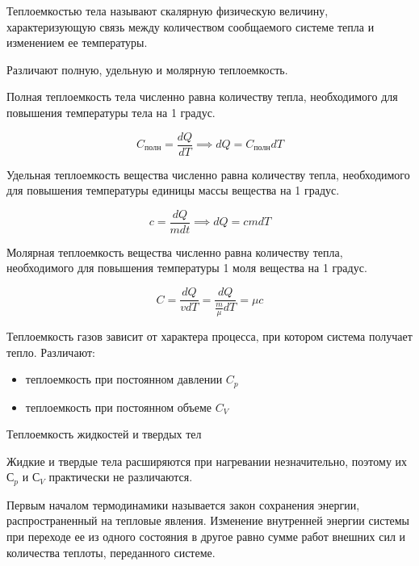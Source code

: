 \begin{definition}
    Теплоемкостью тела называют скалярную физическую величину, 
    характеризующую связь между количеством сообщаемого системе тепла 
    и изменением ее температуры.

    Различают полную, удельную и молярную теплоемкость.
\end{definition}

\begin{definition}
    Полная теплоемкость тела численно равна количеству тепла, 
    необходимого для повышения температуры тела на 1 градус.

    $$C_{полн} = \frac{dQ}{dT} \implies dQ = C_{полн}dT$$
\end{definition}

\begin{definition}
    Удельная теплоемкость вещества численно равна количеству тепла, 
    необходимого для повышения температуры единицы массы вещества на 
    1 градус.

    $$c = \frac{dQ}{mdt} \implies dQ = cmdT$$
\end{definition}

\begin{definition}
    Молярная теплоемкость вещества численно равна количеству тепла, 
    необходимого для повышения температуры 1 моля вещества на 1 градус.

    $$C = \frac{dQ}{vdT} = \frac{dQ}{\frac{m}{\mu} dT} = \mu c$$
\end{definition}

\begin{remark}
    Теплоемкость газов зависит от характера процесса, при котором система 
получает тепло. Различают:
\begin{itemize}
    \item теплоемкость при постоянном давлении $C_p$
    \item теплоемкость при постоянном объеме $C_V$
\end{itemize}
\end{remark}

\begin{remark}
    Теплоемкость жидкостей и твердых тел

    Жидкие и твердые тела расширяются при нагревании незначительно, 
    поэтому их $С_p$ и $С_V$ практически не различаются.
\end{remark}

\begin{definition}
    Первым началом термодинамики называется закон сохранения энергии, 
распространенный на тепловые явления.
Изменение внутренней энергии системы при переходе ее из одного 
состояния в другое равно сумме работ внешних сил и количества теплоты, 
переданного системе.
\end{definition}

